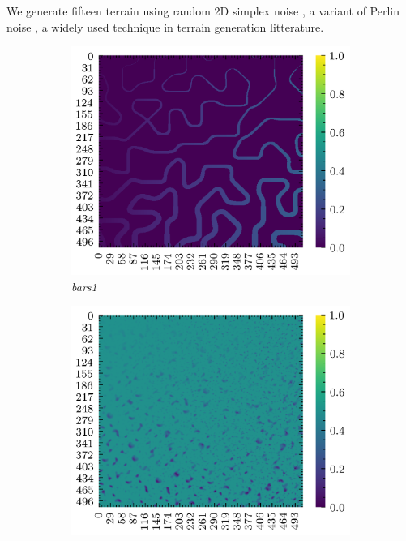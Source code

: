 \documentclass[../document.tex]{subfiles}
\begin{document}
We generate fifteen terrain using random 2D simplex noise \cite{simplex}, a variant of Perlin noise \cite{perlin}, a widely used technique in terrain generation litterature.
\begin{figure}[H]
    \centering
        \begin{subfigure}[b]{0.45\textwidth}
            \includegraphics[width=\textwidth]{../img/hm/bars1.png}
            \caption{\emph{bars1}}
        \end{subfigure}
        \begin{subfigure}[b]{0.45\linewidth}
            \includegraphics[width=\textwidth]{../img/hm/holes1.png}

\end{subfigure}
\end{figure}
\end{document}
